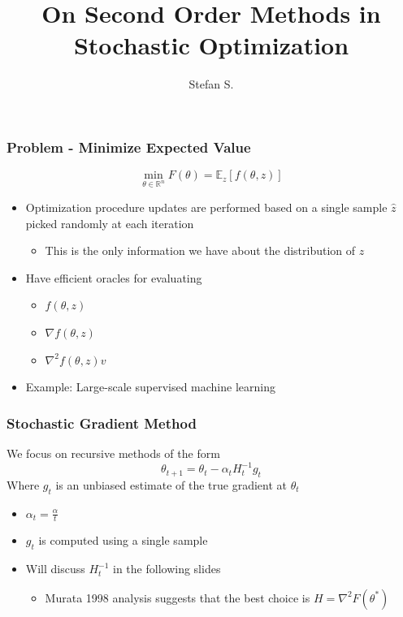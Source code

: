 \documentclass{beamer}
\begin{document}
\title{On Second Order Methods in Stochastic Optimization}
\author{Stefan S.}

\begin{frame}
	\titlepage
\end{frame}	

\begin{frame}
	\frametitle{Problem - Minimize Expected Value}
	\[
		\min_{\theta \in \mathbb{R}^n} F(\theta) = \mathbb{E}_z[ f(\theta,z)]
	\]
	\begin{itemize}
		\pause
		\item Optimization procedure updates are performed based on a single sample $\hat{z}$ picked randomly at each iteration
		\pause
		\begin{itemize}
		\item This is the only information we have about the distribution of $z$
		\end{itemize}
		\pause
		\item Have efficient oracles for evaluating
		\begin{itemize}
		\item $f(\theta,z)$ 
		\item $\nabla f(\theta,z)$
		\item $\nabla^2 f(\theta,z) v$
		\end{itemize}
		\pause
		\item Example: Large-scale supervised machine learning
	\end{itemize}
\end{frame}

\begin{frame}
	\frametitle{Stochastic Gradient Method}
	We focus on recursive methods of the form
	\[
		\theta_{t+1}= \theta_t - \alpha_t H_t^{-1} g_t 
	\]
	Where $g_t$ is an unbiased estimate of the true gradient at $\theta_t$
	\begin{itemize}
		\pause
		\item $\alpha_t = \frac{\alpha}{t}$
		\pause
		\item $g_t$ is computed using a single sample
		\pause
		\item Will discuss $H_t^{-1}$ in the following slides
		\begin{itemize}
			\item Murata 1998 analysis suggests that the best choice is $H =\nabla^2 F(\theta^*) $
		\end{itemize} 
	\end{itemize}
\end{frame}
\end{document}
